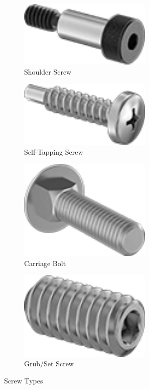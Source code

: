 \documentclass[10pt,letterpaper]{book}
\begin{document}
\begin{figure}[H]
		\begin{subfigure}[b]{.24\linewidth}
			\includegraphics[width=0.7\textwidth]{imgs/shoulderscrew.png}
			\caption{Shoulder Screw}
		\end{subfigure}\begin{subfigure}[b]{.24\linewidth}
			\includegraphics[width=0.7\textwidth]{imgs/stscrew.png}
			\caption{Self-Tapping Screw}
		\end{subfigure}\begin{subfigure}[b]{.24\linewidth}
			\includegraphics[width=0.7\textwidth]{imgs/carriagebolt.png}
			\caption{Carriage Bolt}
		\end{subfigure}\begin{subfigure}[b]{.24\linewidth}
			\includegraphics[width=0.7\textwidth]{imgs/grubscrew.png}
			\caption{Grub/Set Screw}
		\end{subfigure}
		\caption{Screw Types}
	\end{figure}
	
\end{document}
